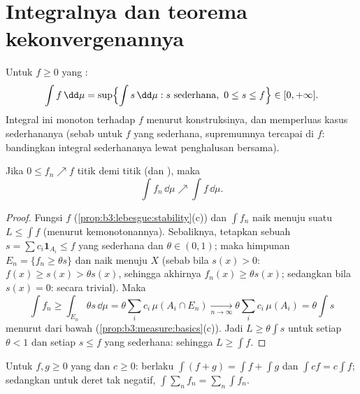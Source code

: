 \section{Integralnya dan teorema kekonvergenannya}

\begin{definition}\label{def:b3:lebesgue:integral}
Untuk $f \geq 0$ yang :
\[
\int f \,\dd\mu = \sup\Bigl\{\int s\,\dd\mu : s \text{ sederhana},
\ 0 \leq s \leq f\Bigr\} \in [0, +\infty].
\]
Integral ini monoton terhadap $f$ menurut konstruksinya, dan memperluas kasus
sederhananya (sebab untuk $f$ yang sederhana, supremumnya tercapai di $f$: bandingkan
integral sederhananya lewat penghalusan bersama).
\end{definition}

\begin{theorem}
\label{thm:b3:lebesgue:mct}
Jika $0 \leq f_n \nearrow f$ titik demi titik (dan ), maka
\[
\int f_n\,\dd\mu \nearrow \int f\,\dd\mu .
\]
\end{theorem}

\begin{proof}
Fungsi $f$  (\cref{prop:b3:lebesgue:stability}(c)) dan
$\int f_n$ naik menuju suatu $L \leq \int f$ (menurut kemonotonannya).
Sebaliknya, tetapkan sebuah $s = \sum c_i\mathbf 1_{A_i} \leq f$ yang sederhana
dan $\theta \in (0,1)$; maka himpunan $E_n = \{f_n \geq \theta s\}$
 dan naik menuju $X$ (sebab bila $s(x) > 0$: $f(x)
\geq s(x) > \theta s(x)$, sehingga akhirnya $f_n(x) \geq \theta
s(x)$; sedangkan bila $s(x) = 0$: secara trivial). Maka
\[
\int f_n \geq \int_{E_n}\theta s\,\dd\mu
= \theta\sum_i c_i\,\mu(A_i \cap E_n)
\xrightarrow[n\to\infty]{} \theta\sum_ic_i\,\mu(A_i)
= \theta\int s
\]
menurut  dari bawah (\cref{prop:b3:measure:basics}(c)).
Jadi $L \geq \theta\int s$ untuk setiap $\theta < 1$ dan setiap $s
\leq f$ yang sederhana: sehingga $L \geq \int f$.
\end{proof}

\begin{corollary}\label{cor:b3:lebesgue:additivity}
Untuk $f, g \geq 0$ yang  dan $c \geq 0$: berlaku $\int(f + g) =
\int f + \int g$ dan $\int cf = c\int f$; sedangkan untuk deret
 tak negatif, $\int\sum_nf_n =
\sum_n\int f_n$.
\end{corollary}

